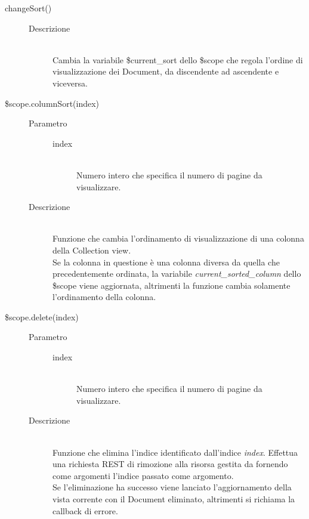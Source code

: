 \begin{description}
\begin{description}
  \item[changeSort()] \hfill 
  \begin{description}
  	\item[Descrizione] \hfill \\
  Cambia la variabile \$current\_sort dello \$scope che regola l'ordine di visualizzazione dei Document, da discendente ad ascendente e viceversa.
  \end{description}
  
  \item[\$scope.columnSort(index)] \hfill
  \begin{description}
  	\item[Parametro] \hfill
  	\begin{description}
  		\item[index] \hfill \\
  		Numero intero che specifica il numero di pagine da visualizzare.
  	\end{description}
  	\item[Descrizione] \hfill \\
  	  Funzione che cambia l'ordinamento di visualizzazione di una colonna della Collection view. \\
  Se la colonna in questione è una colonna diversa da quella che precedentemente ordinata,
  la variabile \textit{current\_sorted\_column} dello \$scope viene aggiornata, altrimenti la funzione cambia solamente
  l'ordinamento della colonna.
  \end{description}
  
  \item[\$scope.delete(index)] \hfill
  \begin{description}
  	\item[Parametro] \hfill
  	\begin{description}
  		\item[index] \hfill \\
  		Numero intero che specifica il numero di pagine da visualizzare.
  	\end{description}
  	\item[Descrizione] \hfill \\
  	  Funzione che elimina l'indice identificato dall'indice \textit{index}. Effettua una richiesta REST di rimozione alla risorsa
  gestita da  fornendo come argomenti l'indice passato come argomento. \\
  Se l'eliminazione ha successo viene lanciato l'aggiornamento della vista corrente con il Document eliminato, altrimenti si richiama la callback di errore.
  \end{description}
  

\end{description}
\end{description}
